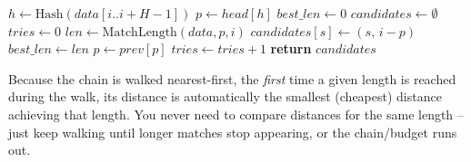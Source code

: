 \documentclass[11pt]{article}
\begin{document}
\begin{algorithm}[H]
\caption{Find match candidates ending at position $l$ (equivalently, starting at $i = l -
s + 1$ for the position under consideration)}
\label{alg:findmatches}
\begin{algorithmic}[1]
  \State $h \gets \text{Hash}(data[i..i+H-1])$
  \State $p \gets head[h]$
  \State $best\_len \gets 0$
  \State $candidates \gets \emptyset$ 
  \State $tries \gets 0$
   
    \State $len \gets \text{MatchLength}(data, p, i)$ 
        \State $candidates[s] \gets (s,\, i - p)$ 
      \EndFor
      \State $best\_len \gets len$
    \EndIf
    \State $p \gets prev[p]$
    \State $tries \gets tries + 1$
  \EndWhile
  \State \textbf{return} $candidates$
\EndProcedure
\end{algorithmic}
\end{algorithm}

\begin{tcolorbox}[colback=blue!5!white,colframe=blue!50!black,title=Key property this relies on]
Because the chain is walked nearest-first, the \emph{first} time a given length is
reached during the walk, its distance is automatically the smallest (cheapest) distance
achieving that length. You never need to compare distances for the same length --
just keep walking until longer matches stop appearing, or the chain/budget runs out.
\end{tcolorbox}
\end{document}
